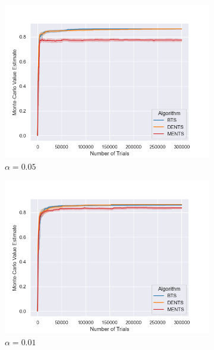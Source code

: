 \begin{figure}
                \begin{subfigure}[b]{0.32\textwidth}
                    \centering
                    \includegraphics[width=\textwidth]{figures/temp/fl_sens/056_fl8_0_05_01.png}
                    \caption{$\alpha=0.05$}
                \end{subfigure}
                \begin{subfigure}[b]{0.32\textwidth}
                    \centering
                    \includegraphics[width=\textwidth]{figures/temp/fl_sens/057_fl8_0_01_01.png}
                    \caption{$\alpha=0.01$}
                \end{subfigure}
                \begin{subfigure}[b]{0.32\textwidth}

\end{subfigure}
\end{figure}
